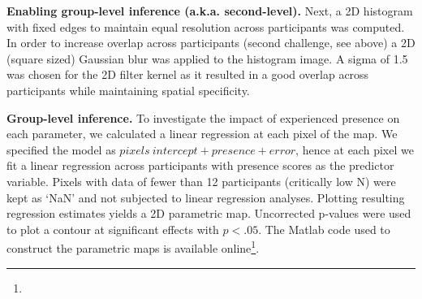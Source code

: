 \textbf{Enabling group-level inference (a.k.a. second-level).} Next, a 2D histogram with fixed edges to maintain equal resolution across participants was computed. In order to increase overlap across participants (second challenge, see above) a 2D (square sized) Gaussian blur was applied to the histogram image. A sigma of 1.5 was chosen for the 2D filter kernel as it resulted in a good overlap across participants while maintaining spatial specificity. 

\textbf{Group-level inference.} To investigate the impact of experienced presence on each parameter, we calculated a linear regression at each pixel of the map. We specified the model as $pixels ~ intercept + presence + error$, hence at each pixel we fit a linear regression across participants with presence scores as the predictor variable. Pixels with data of fewer than 12 participants (critically low N) were kept as `NaN' and not subjected to linear regression analyses. Plotting resulting regression estimates yields a 2D parametric map. Uncorrected p-values were used to plot a contour at significant effects with $p < .05$. The Matlab code used to construct the parametric maps is available online\footnote{}.




